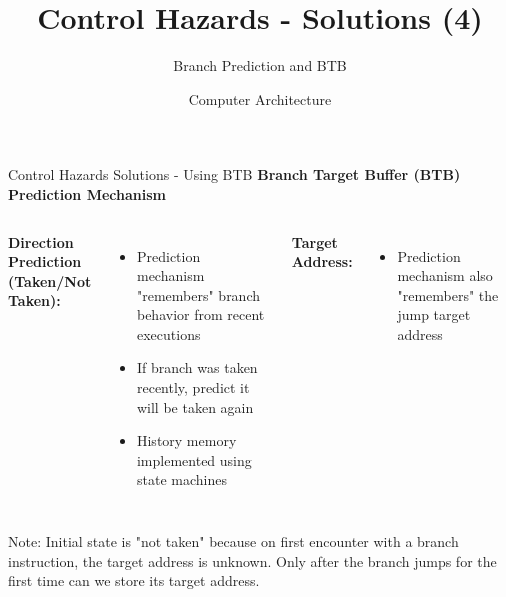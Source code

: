 \documentclass[aspectratio=169,12pt]{beamer}
\title{Control Hazards - Solutions (4)}
\subtitle{Branch Prediction and BTB}
\author{Computer Architecture}
\date{}
\begin{document}
\frame{\titlepage}

\begin{frame}{Control Hazards Solutions - Using BTB}
\textbf{Branch Target Buffer (BTB) Prediction Mechanism}

\begin{columns}
\textbf{Direction Prediction (Taken/Not Taken):}
\begin{itemize}
    \item Prediction mechanism "remembers" branch behavior from recent executions
    \item If branch was taken recently, predict it will be taken again
    \item History memory implemented using state machines
\end{itemize}

\textbf{Target Address:}
\begin{itemize}
    \item Prediction mechanism also "remembers" the jump target address
\end{itemize}

\end{columns}

\vspace{0.3cm}
\begin{tcolorbox}[colback=yellow!10]
\small
Note: Initial state is "not taken" because on first encounter with a branch instruction, the target address is unknown. Only after the branch jumps for the first time can we store its target address.
\end{tcolorbox}
\end{frame}
\end{document}
